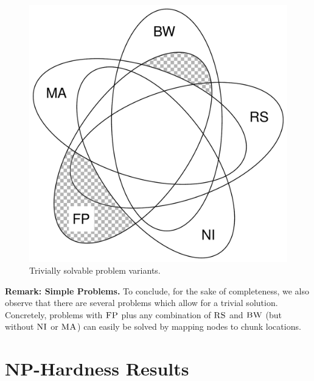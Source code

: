 \documentclass[9pt]{sigcomm-alternate}
\newcommand{\CC}{\textsc{NI}}
\newcommand{\FP}{\textsc{FP}}
\newcommand{\RS}{\textsc{RS}}
\newcommand{\BW}{\textsc{BW}}
\newcommand{\MA}{\textsc{MA}}
\begin{document}

\begin{figure}
\includegraphics[width=0.48\columnwidth]{figs/venn_trivial.pdf}
\caption{Trivially solvable problem variants.}
\label{fig:venn_trivial}
\end{figure}
\textbf{Remark: Simple Problems.}
To conclude, for the sake of completeness, we also observe that there are
several problems which
allow for a trivial solution. Concretely, problems with $\FP$
plus any combination of
$\RS$ and $\BW$ (but without $\CC$ or $\MA$) can easily be solved by mapping nodes to chunk locations.



\section{NP-Hardness Results}\label{sec:np}
\end{document}
